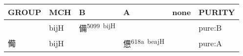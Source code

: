 \documentclass[14pt,a4paper]{scrartcl}
\begin{document}
\begin{longtable}[c]{@{}llllll@{}}
\toprule
\begin{minipage}[b]{0.14\columnwidth}\raggedright\strut
GROUP
\strut\end{minipage} &
\begin{minipage}[b]{0.14\columnwidth}\raggedright\strut
MCH
\strut\end{minipage} &
\begin{minipage}[b]{0.14\columnwidth}\raggedright\strut
B
\strut\end{minipage} &
\begin{minipage}[b]{0.14\columnwidth}\raggedright\strut
A
\strut\end{minipage} &
\begin{minipage}[b]{0.14\columnwidth}\raggedright\strut
none
\strut\end{minipage} &
\begin{minipage}[b]{0.14\columnwidth}\raggedright\strut
PURITY
\strut\end{minipage}\tabularnewline
\midrule
\endhead
\begin{minipage}[t]{0.14\columnwidth}\raggedright\strut
𤰈
\strut\end{minipage} &
\begin{minipage}[t]{0.14\columnwidth}\raggedright\strut
bijH
\strut\end{minipage} &
\begin{minipage}[t]{0.14\columnwidth}\raggedright\strut
備\textsuperscript{5099~bijH}
\strut\end{minipage} &
\begin{minipage}[t]{0.14\columnwidth}\raggedright\strut
\strut\end{minipage} &
\begin{minipage}[t]{0.14\columnwidth}\raggedright\strut
\strut\end{minipage} &
\begin{minipage}[t]{0.14\columnwidth}\raggedright\strut
pure:B
\strut\end{minipage}\tabularnewline
\begin{minipage}[t]{0.14\columnwidth}\raggedright\strut
僃
\strut\end{minipage} &
\begin{minipage}[t]{0.14\columnwidth}\raggedright\strut
bijH
\strut\end{minipage} &
\begin{minipage}[t]{0.14\columnwidth}\raggedright\strut
\strut\end{minipage} &
\begin{minipage}[t]{0.14\columnwidth}\raggedright\strut
憊\textsuperscript{618a~beajH}
\strut\end{minipage} &
\begin{minipage}[t]{0.14\columnwidth}\raggedright\strut
\strut\end{minipage} &
\begin{minipage}[t]{0.14\columnwidth}\raggedright\strut
pure:A
\strut\end{minipage}\tabularnewline
\bottomrule
\end{longtable}
\end{document}
